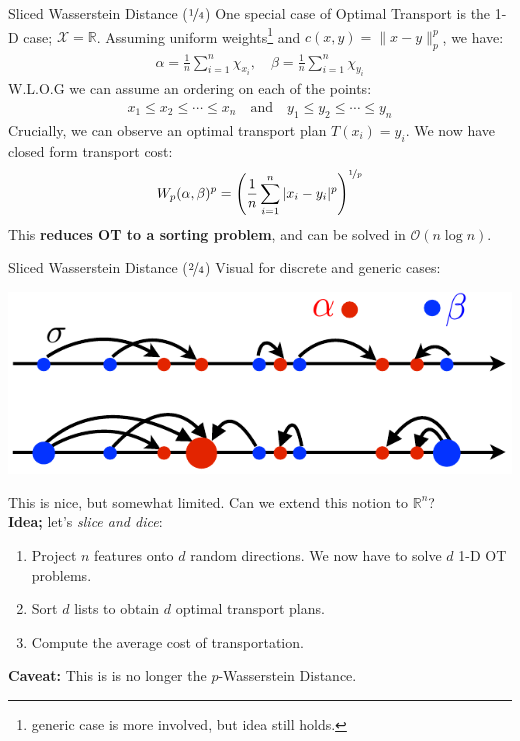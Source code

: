 \documentclass{beamer}
\begin{document}
\begin{frame}{Sliced Wasserstein Distance ($\nicefrac{1}{4}$)}
	One special case of Optimal Transport is the 1-D case; $\mathcal{X} = \mathbb{R}$. Assuming uniform weights\footnote{generic case is more involved, but idea still holds.} and $c(x, y) = \| x - y \|^p_p$, we have:
	\begin{gather}
		\alpha = \frac{1}{n} \sum^n_{i=1} \chi_{x_i}, \quad \beta = \frac{1}{n} \sum^n_{i=1} \chi_{y_i}
	\end{gather} \pause
	W.L.O.G we can assume an ordering on each of the points:
	\begin{gather}
		x_1 \leq x_2 \leq \cdots \leq x_n \quad \text{and} \quad y_1 \leq y_2 \leq \cdots \leq y_n
	\end{gather} \pause
	Crucially, we can observe an optimal transport plan $T(x_i) = y_i$. \pause We now have closed form transport cost:
	\vspace{-1em}
	\begin{gather}
		W_p (\alpha, \beta)^p = \left(\frac{1}{n} \sum^n_{i=1} |x_i - y_i|^p\right)^{\nicefrac{1}{p}}
	\end{gather} \pause
	\vspace{1em}
	This \textbf{reduces OT to a sorting problem}, and can be solved in $\mathcal{O}(n \log n)$.
\end{frame}

\begin{frame}{Sliced Wasserstein Distance ($\nicefrac{2}{4}$)}
	Visual for discrete and generic cases:
	\vspace{-1em}
	\begin{center}
		\includegraphics[width=.65\textwidth]{img/1d-schematic}
	\end{center} \pause
	\vspace{-1em}

	This is nice, but somewhat limited. Can we extend this notion to $\mathbb{R}^n$? \pause \newline \\

	\textbf{Idea;} let's \textit{slice and dice}:
	\begin{enumerate}[label=\arabic*.]
		\item Project $n$ features onto $d$ random directions. \pause We now have to solve $d$ 1-D OT problems. \pause
		\item Sort $d$ lists to obtain $d$ optimal transport plans. \pause
		\item Compute the average cost of transportation. \pause
	\end{enumerate}
	
	\textbf{Caveat:} This is is no longer the $p$-Wasserstein Distance.
\end{frame}
\end{document}
